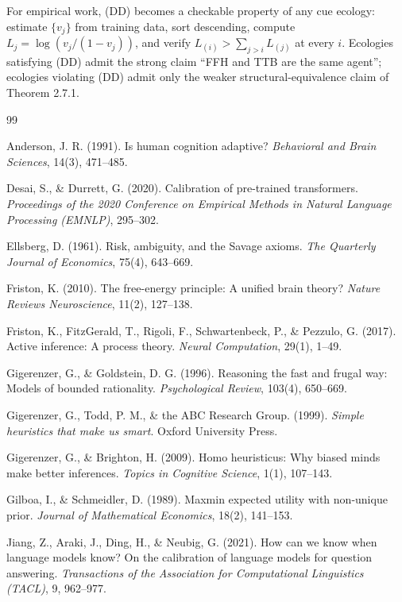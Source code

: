 \documentclass{article}
\begin{document}
For empirical work, (DD) becomes a checkable property of any cue
ecology: estimate \(\{v_{j}\}\) from training data, sort descending,
compute \(L_{j} = \log(v_{j}/(1-v_{j}))\), and verify
\(L_{(i)} > \sum_{j>i} L_{(j)}\) at every \(i\). Ecologies satisfying
(DD) admit the strong claim ``FFH and TTB are the same agent'';
ecologies violating (DD) admit only the weaker structural-equivalence
claim of Theorem 2.7.1.



\begin{thebibliography}{99}

 Anderson, J. R. (1991). Is human cognition adaptive? \emph{Behavioral and Brain Sciences}, 14(3), 471--485.

 Desai, S., \& Durrett, G. (2020). Calibration of pre-trained transformers. \emph{Proceedings of the 2020 Conference on Empirical Methods in Natural Language Processing (EMNLP)}, 295--302.

 Ellsberg, D. (1961). Risk, ambiguity, and the Savage axioms. \emph{The Quarterly Journal of Economics}, 75(4), 643--669.

 Friston, K. (2010). The free-energy principle: A unified brain theory? \emph{Nature Reviews Neuroscience}, 11(2), 127--138.

 Friston, K., FitzGerald, T., Rigoli, F., Schwartenbeck, P., \& Pezzulo, G. (2017). Active inference: A process theory. \emph{Neural Computation}, 29(1), 1--49.

 Gigerenzer, G., \& Goldstein, D. G. (1996). Reasoning the fast and frugal way: Models of bounded rationality. \emph{Psychological Review}, 103(4), 650--669.

 Gigerenzer, G., Todd, P. M., \& the ABC Research Group. (1999). \emph{Simple heuristics that make us smart}. Oxford University Press.

 Gigerenzer, G., \& Brighton, H. (2009). Homo heuristicus: Why biased minds make better inferences. \emph{Topics in Cognitive Science}, 1(1), 107--143.

 Gilboa, I., \& Schmeidler, D. (1989). Maxmin expected utility with non-unique prior. \emph{Journal of Mathematical Economics}, 18(2), 141--153.

 Jiang, Z., Araki, J., Ding, H., \& Neubig, G. (2021). How can we know when language models know? On the calibration of language models for question answering. \emph{Transactions of the Association for Computational Linguistics (TACL)}, 9, 962--977.


\end{thebibliography}
\end{document}
